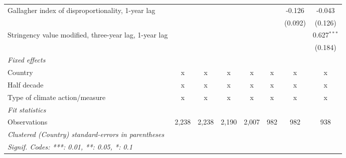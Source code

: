 \begin{table}[htbp]
\begin{tabular}{lccccccc}
      Gallagher index of disproportionality, 1-year lag     &         &               &             &              &             & -0.126      & -0.043\\   
                                                            &         &               &             &              &             & (0.092)     & (0.126)\\   
      Stringency value modified, three-year lag, 1-year lag &         &               &             &              &             &             & 0.627$^{***}$\\   
                                                            &         &               &             &              &             &             & (0.184)\\   
      \emph{Fixed effects}\\
      Country                                               & x       & x             & x           & x            & x           & x           & x\\  
      Half decade                                           & x       & x             & x           & x            & x           & x           & x\\  
      Type of climate action/measure                        & x       & x             & x           & x            & x           & x           & x\\  
      \midrule \emph{Fit statistics}\\
      Observations                                          & 2,238   & 2,238         & 2,190       & 2,007        & 982         & 982         & 938\\  
      \midrule
      \multicolumn{8}{l}{\emph{Clustered (Country) standard-errors in parentheses}}\\
      \multicolumn{8}{l}{\emph{Signif. Codes: ***: 0.01, **: 0.05, *: 0.1}}\\
   \end{tabular}
\end{table}


